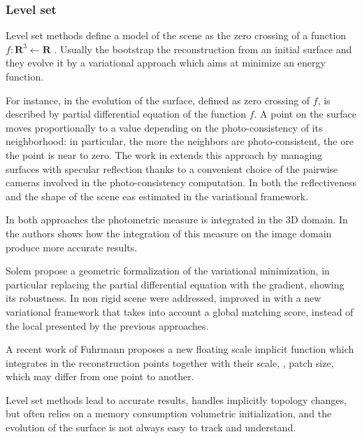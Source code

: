 \subsubsection{Level set}
Level set methods define a model of the scene as the zero crossing of a function $f:\mathbf{R}^3\leftarrow\mathbf{R}$ \cite{faugeras2002variational,jin2002variational,yezzi2003stereoscopic,fuhrmann2014floating,solem2005geometric,yoon2010joint,pons2007multi}. 
Usually the bootstrap the reconstruction from an initial surface and they evolve it by a variational approach which aims at minimize an energy function.

For instance, in \cite{faugeras2002variational} the evolution of the surface, defined as zero crossing of $f$, is described by partial differential equation of the function $f$. A point on the surface moves proportionally to a value depending on the photo-consistency of its neighborhood: in particular, the more the neighbors are photo-consistent, the ore the point is near to zero.
The work in \cite{jin2002variational} extends this approach by managing surfaces with specular reflection thanks to a convenient choice of the pairwise cameras involved in the photo-consistency computation. In \cite{yoon2010joint} both the reflectiveness and the shape of the scene eas estimated in the variational framework.

In both approaches the photometric measure is integrated in the 3D domain. In \cite{yezzi2003stereoscopic} the authors shows how the integration of this measure on the image domain produce more accurate results.

Solem \etal \cite{solem2005geometric} propose a geometric formalization of the variational minimization, in particular replacing the partial differential equation with the gradient, showing its robustness.
In \cite{pons2005modelling} non rigid scene were addressed, improved in \cite{pons2007multi}  with a new variational framework that takes into account a global matching score, instead of the local presented by the previous approaches.

A recent work of Fuhrmann \etal proposes a new floating scale implicit function which integrates in the reconstruction  points together with their scale, \eg, patch size, which may differ from one point to another. 


Level set methods lead to accurate results, handles implicitly topology changes, but often relies on a memory consumption volumetric initialization, and the evolution of the surface is not always easy to track and understand.
